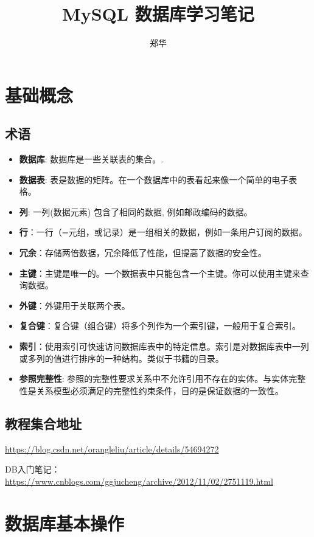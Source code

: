 \documentclass[UTF8,a4paper,12pt]{ctexbook}
\author{\kaishu 郑华}
\title{\heiti MySQL 数据库学习笔记}
\begin{document}
 	\maketitle
 \chapter{基础概念}
	 \section{术语}
		 \begin{itemize}
		 	\item  \textbf{数据库}: 数据库是一些关联表的集合。.
		 	\item  \textbf{数据表}: 表是数据的矩阵。在一个数据库中的表看起来像一个简单的电子表格。
		 	\item  \textbf{列}: 一列(数据元素) 包含了相同的数据, 例如邮政编码的数据。
		 	\item  \textbf{行}：一行（=元组，或记录）是一组相关的数据，例如一条用户订阅的数据。
		 	\item  \textbf{冗余}：存储两倍数据，冗余降低了性能，但提高了数据的安全性。
		 	\item  \textbf{主键}：主键是唯一的。一个数据表中只能包含一个主键。你可以使用主键来查询数据。
		 	\item  \textbf{外键}：外键用于关联两个表。
		 	\item  \textbf{复合键}：复合键（组合键）将多个列作为一个索引键，一般用于复合索引。
		 	\item  \textbf{索引}：使用索引可快速访问数据库表中的特定信息。索引是对数据库表中一列或多列的值进行排序的一种结构。类似于书籍的目录。
		 	\item  \textbf{参照完整性}: 参照的完整性要求关系中不允许引用不存在的实体。与实体完整性是关系模型必须满足的完整性约束条件，目的是保证数据的一致性。
		 \end{itemize}
		
	 
	 \section{教程集合地址}
	 	\url{https://blog.csdn.net/orangleliu/article/details/54694272}
	 	
	 	DB入门笔记：\url{https://www.cnblogs.com/ggjucheng/archive/2012/11/02/2751119.html}
	 	
\chapter{数据库基本操作}
\end{document}
